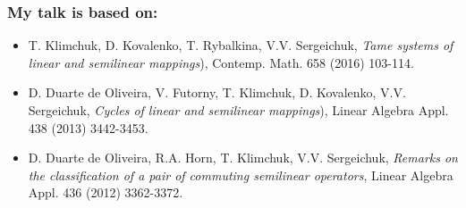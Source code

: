 \documentclass[usenames,dvipsnames]{beamer}
\begin{document}
\begin{frame}
\frametitle{My talk is based on:}

\begin{itemize}

  \item \alert{T. Klimchuk,
  D. Kovalenko, T. Rybalkina,
  V.V. Sergeichuk}, {\it Tame systems
  of linear and semilinear mappings}),
   Contemp. Math. 658 (2016) 103-114.
\bigskip
\bigskip


  \item \alert{D. Duarte de
      Oliveira, V. Futorny, T.
      Klimchuk, D. Kovalenko, V.V.
      Sergeichuk}, {\it Cycles of
      linear and semilinear
      mappings}), Linear Algebra
      Appl. 438 (2013) 3442-3453.
\bigskip
\bigskip

  \item \alert{D. Duarte de
      Oliveira, R.A. Horn, T.
      Klimchuk, V.V. Sergeichuk},
      {\it Remarks on the
      classification of a pair of
      commuting semilinear
      operators}, Linear Algebra
      Appl. 436 (2012) 3362-3372.



\end{itemize}



\end{frame}
\end{document}
